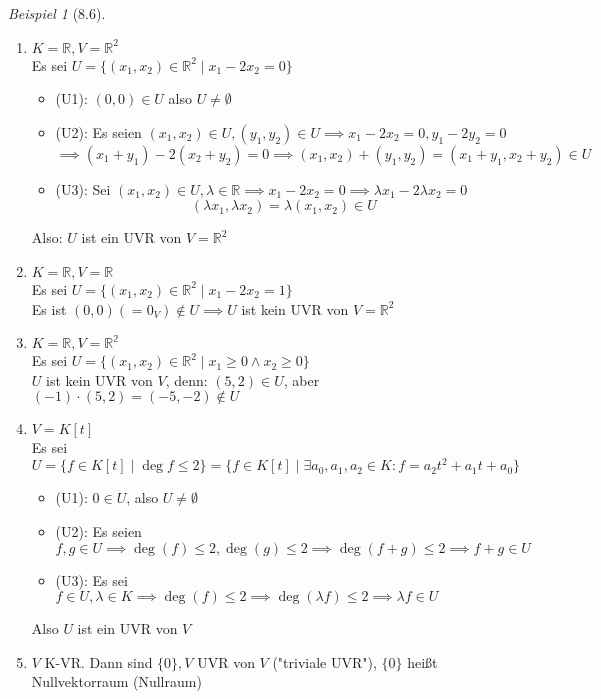\documentclass[a4paper]{scrartcl}
\DeclareMathOperator{\Exists}{\exists}
\theoremstyle{definition}
\theoremstyle{plain}
\theoremstyle{plain}
\theoremstyle{remark}
\theoremstyle{remark}
\theoremstyle{remark}
\theoremstyle{remark}
\theoremstyle{remark}
\newtheorem{ex}{Beispiel}
\begin{document}
\begin{ex}[8.6]
\mbox{}
\begin{enumerate}
\item $K = \mathbb{R}, V = \mathbb{R}^2$ \\
         Es sei $U = \{(x_1, x_2) \in \mathbb{R}^2 \mid x_1 - 2 x_2 = 0\}$
\begin{itemize}
\item (U1): $(0, 0) \in U$ also $U\neq \emptyset$
\item (U2): Es seien $(x_1, x_2) \in U, (y_1, y_2) \in U \implies x_1 - 2 x_2 = 0, y_1 - 2 y_2 = 0$
           \[\implies (x_1 + y_1) - 2(x_2 + y_2) = 0 \implies (x_1, x_2) + (y_1, y_2) = (x_1 + y_1, x_2 + y_2) \in U\]
\item (U3): Sei $(x_1, x_2) \in U, \lambda \in \mathbb{R} \implies x_1 - 2 x_2 = 0 \implies \lambda x_1 - 2\lambda x_2 = 0$
           \[(\lambda x_1, \lambda x_2) = \lambda (x_1, x_2) \in U\]
\end{itemize}
Also: $U$ ist ein UVR von $V = \mathbb{R}^2$
\item $K = \mathbb{R}, V = \mathbb{R}$ \\
         Es sei $U = \{(x_1, x_2) \in \mathbb{R}^2 \mid x_1 - 2 x_2 = 1\}$ \\
         Es ist $(0,0) ( = 0_V) \not\in U \implies U$ ist kein UVR von $V = \mathbb{R}^2$
\item $K = \mathbb{R}, V = \mathbb{R^2}$ \\
         Es sei $U = \{(x_1, x_2) \in \mathbb{R}^2 \mid x_1 \geq 0 \wedge x_2 \geq 0\}$ \\
         $U$ ist kein UVR von $V$, denn: $(5,2) \in U$, aber $(-1)\cdot (5,2) = (-5, -2) \not\in U$
\item $V = K[t]$ \\
         Es sei $U = \{f \in K[t] \mid \deg f \leq 2\} = \{f\in K[t] \mid \Exists a_0, a_1, a_2 \in K: f = a_2 t^2 + a_1 t + a_0\}$
\begin{itemize}
\item (U1): $0 \in U$, also $U \neq \emptyset$
\item (U2): Es seien $f,g \in U \implies \deg (f) \leq 2, \deg (g) \leq 2 \implies \deg(f + g) \leq 2 \implies f + g \in U$
\item (U3): Es sei $f \in U, \lambda \in K \implies \deg(f) \leq 2 \implies \deg(\lambda f) \leq 2 \implies \lambda f \in U$
\end{itemize}
Also $U$ ist ein UVR von $V$
\item $V$ K-VR. Dann sind $\{0\}, V$ UVR von $V$ ("triviale UVR"), $\{0\}$ heißt Nullvektorraum (Nullraum)
\end{enumerate}
\end{ex}
\end{document}
